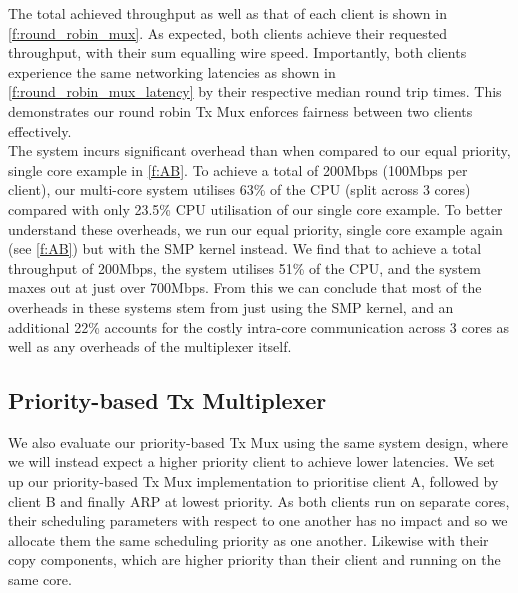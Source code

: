 The total achieved throughput as well as that of each client is shown in \autoref{f:round_robin_mux}. As expected, both clients achieve their 
requested throughput, with their sum equalling wire speed. Importantly, both clients experience the same networking latencies as shown
in \autoref{f:round_robin_mux_latency} by their respective median round trip times. This demonstrates our round robin Tx Mux enforces
fairness between two clients effectively.\\

The system incurs significant overhead than when compared to our equal priority, single core example in \autoref{f:AB}. To
achieve a total of 200Mbps (100Mbps per client), our multi-core system utilises 63\% of the CPU (split across 3 cores) compared with 
only 23.5\% CPU utilisation of our single core example. To better understand these overheads, we run our equal priority, 
single core example again (see \autoref{f:AB}) but with the SMP kernel instead. We find that to achieve
a total throughput of 200Mbps, the system utilises 51\% of the CPU, and the system maxes out at just over 700Mbps. 
From this we can conclude that most of the overheads in these systems stem 
from just using the SMP kernel, and an additional 22\% accounts for the costly intra-core communication across 3 cores as 
well as any overheads of the multiplexer itself.

\subsection{Priority-based Tx Multiplexer}

We also evaluate our priority-based Tx Mux using the same system design, where we will instead expect a higher priority client to achieve lower
latencies. We set up our priority-based Tx Mux implementation to prioritise client A, followed by client B and finally ARP at lowest priority.
As both clients run on separate cores, their scheduling parameters with respect to one another has no impact and so we allocate them the same
scheduling priority as one another. Likewise with their copy components, which are higher priority than their client and running on the same core. 


